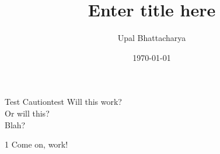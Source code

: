 \documentclass[a4paper]{article}
\author{Upal Bhattacharya}
\date{\today}
\title{Enter title here}
\begin{document}
\maketitle

\linenumbers

\begin{caution}{Test Caution}{test}
  Will this work? \\
  Or will this? \\
  Blah?
\end{caution}


\begin{upal}{}{1}
  Come on, work!
\end{upal}
\end{document}
